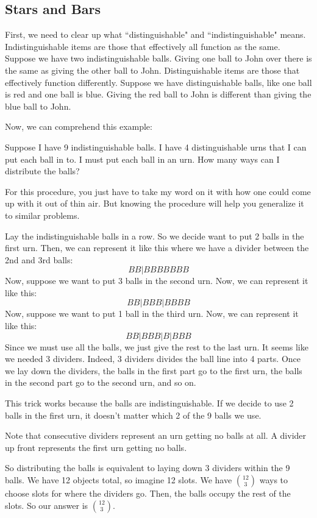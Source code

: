 \documentclass[11pt]{scrartcl}
\begin{document}
\subsection{Stars and Bars}

First, we need to clear up what ``distinguishable" and ``indistinguishable" means. Indistinguishable items are those that effectively all function as the same. Suppose we have two indistinguishable balls. Giving one ball to John over there is the same as giving the other ball to John. Distinguishable items are those that effectively function differently. Suppose we have distinguishable balls, like one ball is red and one ball is blue. Giving the red ball to John is different than giving the blue ball to John.

Now, we can comprehend this example:
\begin{example}
    Suppose I have 9 indistinguishable balls. I have 4 distinguishable urns that I can put each ball in to. I must put each ball in an urn. How many ways can I distribute the balls?
\end{example}
For this procedure, you just have to take my word on it with how one could come up with it out of thin air. But knowing the procedure will help you generalize it to similar problems.

Lay the indistinguishable balls in a row. So we decide want to put 2 balls in the first urn. Then, we can represent it like this where we have a divider between the 2nd and 3rd balls: \[B B | B B B B B B B\] Now, suppose we want to put 3 balls in the second urn. Now, we can represent it like this: \[B B | B B B | B B B B\] Now, suppose we want to put 1 ball in the third urn. Now, we can represent it like this: \[B B | B B B | B | B B B\] Since we must use all the balls, we just give the rest to the last urn. It seems like we needed 3 dividers. Indeed, 3 dividers divides the ball line into 4 parts. Once we lay down the dividers, the balls in the first part go to the first urn, the balls in the second part go to the second urn, and so on.

This trick works because the balls are indistinguishable. If we decide to use 2 balls in the first urn, it doesn't matter which 2 of the 9 balls we use.

Note that consecutive dividers represent an urn getting no balls at all. A divider up front represents the first urn getting no balls.

So distributing the balls is equivalent to laying down 3 dividers within the 9 balls. We have 12 objects total, so imagine 12 slots. We have $\binom{12}{3}$ ways to choose slots for where the dividers go. Then, the balls occupy the rest of the slots. So our answer is $\binom{12}{3}$.
\end{document}
